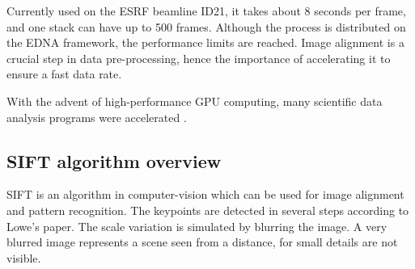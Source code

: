 \documentclass[preprint]{iucr}
\begin{document}
Currently used on the ESRF beamline ID21, it takes about 8 seconds per frame, and one stack can have up to 500 frames. Although the process is distributed on the EDNA\cite{edna} framework, the performance limits are reached. Image alignment is a crucial step in data pre-processing, hence the importance of accelerating it to ensure a fast data rate.

With the advent of high-performance GPU computing, many scientific data analysis programs were accelerated \cite{pyhst,pyfai,Favre-Nicolin}. %

\subsection{SIFT algorithm overview}
SIFT is an algorithm in computer-vision which can be used for image alignment and pattern recognition. The keypoints are detected in several steps according to Lowe's paper\cite{Lowe99}.
The scale variation is simulated by blurring the image. A very blurred image represents a scene seen from a distance, for small details are not visible. 

\end{document}
